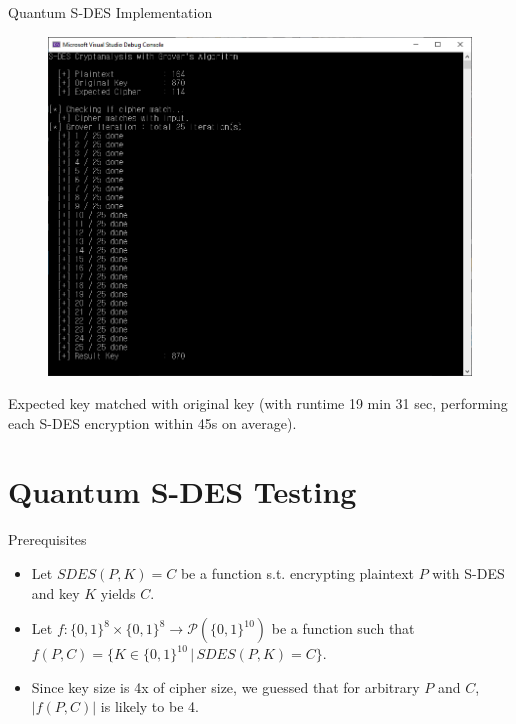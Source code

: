 \documentclass{beamer}
\begin{document}
   	\begin{frame}{Quantum S-DES Implementation}
        \begin{figure}
            \centering
            \includegraphics[height=0.5\textheight]{./Images/Qsharp-SDES-Grover-k1.png}
        \end{figure}
        Expected key matched with original key (with runtime 19 min 31 sec, performing each S-DES encryption within 45s on average).
   	\end{frame}
       
    \section{Quantum S-DES Testing}
       
    \begin{frame}{Prerequisites}
        \begin{itemize}
            \item Let $ SDES(P, K) = C $ be a function s.t. encrypting plaintext $ P $ with S-DES and key $ K $ yields $ C $.
            \item Let $ f : \{0, 1\}^8 \times \{0, 1\}^8 \to \mathcal{P}({\{0, 1\}^{10}})$ be a function such that $ f(P, C) = \{ K \in \{0, 1\}^{10} \,\vert\, SDES(P, K) = C\}$.
            \item Since key size is 4x of cipher size, we guessed that for arbitrary $ P $ and $ C $, $ \left\vert f(P, C) \right\vert$ is likely to be 4.
        \end{itemize}
    \end{frame}
    
\end{document}
